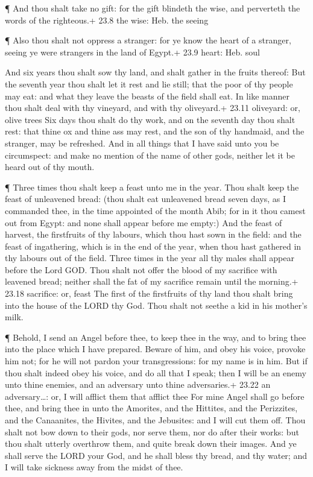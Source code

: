  ¶ And thou shalt take no gift: for the gift blindeth the
wise, and perverteth the words of the righteous.+ 23.8 the wise: Heb.
the seeing

 ¶ Also thou shalt not oppress a stranger: for ye know the
heart of a stranger, seeing ye were strangers in the land of Egypt.+
23.9 heart: Heb. soul

 And six years thou shalt sow thy land, and shalt gather in
the fruits thereof:  But the seventh year thou shalt let it
rest and lie still; that the poor of thy people may eat: and what they
leave the beasts of the field shall eat. In like manner thou shalt deal
with thy vineyard, and with thy oliveyard.+ 23.11 oliveyard: or, olive
trees  Six days thou shalt do thy work, and on the seventh
day thou shalt rest: that thine ox and thine ass may rest, and the son
of thy handmaid, and the stranger, may be refreshed.  And
in all things that I have said unto you be circumspect: and make no
mention of the name of other gods, neither let it be heard out of thy
mouth.

 ¶ Three times thou shalt keep a feast unto me in the year.
 Thou shalt keep the feast of unleavened bread: (thou shalt
eat unleavened bread seven days, as I commanded thee, in the time
appointed of the month Abib; for in it thou camest out from Egypt: and
none shall appear before me empty:)  And the feast of
harvest, the firstfruits of thy labours, which thou hast sown in the
field: and the feast of ingathering, which is in the end of the year,
when thou hast gathered in thy labours out of the field. 
Three times in the year all thy males shall appear before the Lord GOD.
 Thou shalt not offer the blood of my sacrifice with
leavened bread; neither shall the fat of my sacrifice remain until the
morning.+ 23.18 sacrifice: or, feast  The first of the
firstfruits of thy land thou shalt bring into the house of the LORD thy
God. Thou shalt not seethe a kid in his mother's milk.

 ¶ Behold, I send an Angel before thee, to keep thee in the
way, and to bring thee into the place which I have prepared.
 Beware of him, and obey his voice, provoke him not; for he
will not pardon your transgressions: for my name is in him.
 But if thou shalt indeed obey his voice, and do all that I
speak; then I will be an enemy unto thine enemies, and an adversary unto
thine adversaries.+ 23.22 an adversary\ldots: or, I will afflict them
that afflict thee  For mine Angel shall go before thee, and
bring thee in unto the Amorites, and the Hittites, and the Perizzites,
and the Canaanites, the Hivites, and the Jebusites: and I will cut them
off.  Thou shalt not bow down to their gods, nor serve
them, nor do after their works: but thou shalt utterly overthrow them,
and quite break down their images.  And ye shall serve the
LORD your God, and he shall bless thy bread, and thy water; and I will
take sickness away from the midst of thee.

